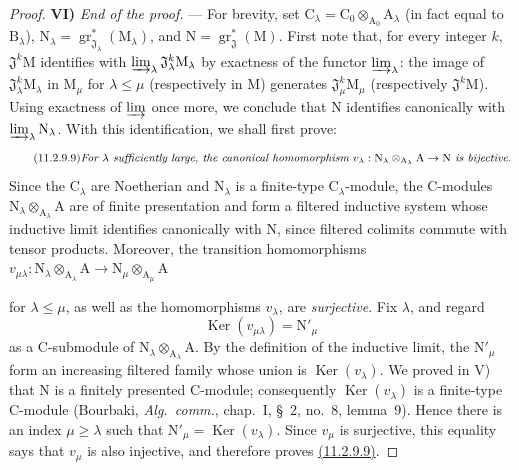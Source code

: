 \begin{proof}
\medskip
\noindent\textbf{VI)} \emph{End of the proof.} --- For brevity, set $\mathrm{C}_\lambda=\mathrm{C}_0\otimes_{\mathrm{A}_0}\mathrm{A}_\lambda$ (in fact equal to $\mathrm{B}_\lambda$), $\mathrm{N}_\lambda=\operatorname{gr}^*_{\mathfrak{J}_\lambda}(\mathrm{M}_\lambda)$, and $\mathrm{N}=\operatorname{gr}^*_\mathfrak{J}(\mathrm{M})$. First note that, for every integer $k$, $\mathfrak{J}^k\mathrm{M}$ identifies with $\varinjlim_\lambda\mathfrak{J}_\lambda^k\mathrm{M}_\lambda$ by exactness of the functor $\varinjlim_\lambda$: the image of $\mathfrak{J}_\lambda^k\mathrm{M}_\lambda$ in $\mathrm{M}_\mu$ for $\lambda\leqslant\mu$ (respectively in $\mathrm{M}$) generates $\mathfrak{J}_\mu^k\mathrm{M}_\mu$ (respectively $\mathfrak{J}^k\mathrm{M}$). Using exactness of $\varinjlim$ once more, we conclude that $\mathrm{N}$ identifies canonically with $\varinjlim_\lambda\mathrm{N}_\lambda$. With this identification, we shall first prove:
\begin{equation}
\label{IV.11.2.9.9}
\tag{11.2.9.9}
\text{\emph{For $\lambda$ sufficiently large, the canonical homomorphism $v_\lambda:\mathrm{N}_\lambda\otimes_{\mathrm{A}_\lambda}\mathrm{A}\to\mathrm{N}$ is bijective.}}
\end{equation}
Since the $\mathrm{C}_\lambda$ are Noetherian and $\mathrm{N}_\lambda$ is a finite-type $\mathrm{C}_\lambda$-module, the $\mathrm{C}$-modules $\mathrm{N}_\lambda\otimes_{\mathrm{A}_\lambda}\mathrm{A}$ are of finite presentation and form a filtered inductive system whose inductive limit identifies canonically with $\mathrm{N}$, since filtered colimits commute with tensor products. Moreover, the transition homomorphisms $v_{\mu\lambda}:\mathrm{N}_\lambda\otimes_{\mathrm{A}_\lambda}\mathrm{A}\to\mathrm{N}_\mu\otimes_{\mathrm{A}_\mu}\mathrm{A}$


for $\lambda\leqslant\mu$, as well as the homomorphisms $v_\lambda$, are
\emph{surjective}. Fix $\lambda$, and regard
\[
  \operatorname{Ker}(v_{\mu\lambda})=\mathrm{N}'_\mu
\]
as a $\mathrm{C}$-submodule of
$\mathrm{N}_\lambda\otimes_{\mathrm{A}_\lambda}\mathrm{A}$. By the
definition of the inductive limit, the $\mathrm{N}'_\mu$ form an
increasing filtered family whose union is $\operatorname{Ker}(v_\lambda)$.
We proved in V) that $\mathrm{N}$ is a finitely presented
$\mathrm{C}$-module; consequently
$\operatorname{Ker}(v_\lambda)$ is a finite-type $\mathrm{C}$-module
(Bourbaki, \emph{Alg.\ comm.}, chap.~I, \S~2, no.~8, lemma~9). Hence
there is an index $\mu\geqslant\lambda$ such that
$\mathrm{N}'_\mu=\operatorname{Ker}(v_\lambda)$. Since $v_\mu$ is
surjective, this equality says that $v_\mu$ is also injective, and
therefore proves {\hyperlink{ega4.c04.thm.11-2-9}{(11.2.9.9)}}.


\end{proof}
